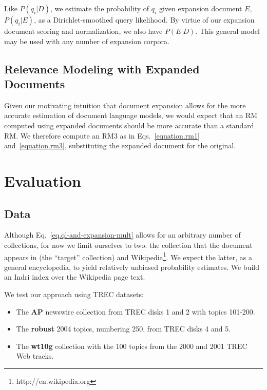 \documentclass[sigconf]{acmart}
\begin{document}
\noindent Like $P(q_i|D)$, we estimate the probability of $q_i$ given expansion document $E$, $P(q_i|E)$, as a Dirichlet-smoothed query likelihood. By virtue of our expansion document scoring and normalization, we also have $P(E|D)$. This general model may be used with any number of expansion corpora.

\subsection{Relevance Modeling with Expanded Documents}

Given our motivating intuition that document expansion allows for the more accurate estimation of document language models, we would expect that an RM computed using expanded documents should be more accurate than a standard RM. We therefore compute an RM3 as in Eqs.~\ref{equation.rm1} and~\ref{equation.rm3}, substituting the expanded document for the original.

\section{Evaluation}\label{section.evaluation}

\subsection{Data}\label{section.evaluation.collections}

Although Eq.~\ref{eq.ql-and-expansion-mult} allows for an arbitrary number of collections, for now we limit ourselves to two: the collection that the document appears in (the ``target'' collection) and Wikipedia\footnote{http://en.wikipedia.org}. We expect the latter, as a general encyclopedia, to yield relatively unbiased probability estimates. We build an Indri \cite{Strohman2005} index over the Wikipedia page text.

We test our approach using TREC datasets:
\begin{itemize}
	\item The \textbf{AP} newswire collection \cite{Harman1992} from TREC disks 1 and 2 with topics 101-200.
	\item The \textbf{robust} 2004 \cite{Voorhees2005} topics, numbering 250, from TREC disks 4 and 5.
	\item The \textbf{wt10g} collection \cite{Bailey2003} with the 100 topics from the 2000 and 2001 TREC Web tracks.
\end{itemize}
\end{document}
